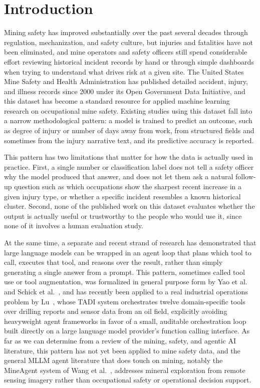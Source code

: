 \documentclass[11pt,a4paper]{article}
\begin{document}
\section{Introduction}

Mining safety has improved substantially over the past several decades
through regulation, mechanization, and safety culture, but injuries and
fatalities have not been eliminated, and mine operators and safety
officers still spend considerable effort reviewing historical incident
records by hand or through simple dashboards when trying to understand
what drives risk at a given site. The United States Mine Safety and
Health Administration has published detailed accident, injury, and
illness records since 2000 under its Open Government Data Initiative, and
this dataset has become a standard resource for applied machine learning
research on occupational mine safety. Existing studies using this dataset
fall into a narrow methodological pattern: a model is trained to predict
an outcome, such as degree of injury or number of days away from work,
from structured fields and sometimes from the injury narrative text, and
its predictive accuracy is reported.

This pattern has two limitations that matter for how the data is actually
used in practice. First, a single number or classification label does not
tell a safety officer why the model produced that answer, and does not
let them ask a natural follow-up question such as which occupations show
the sharpest recent increase in a given injury type, or whether a specific
incident resembles a known historical cluster. Second, none of the
published work on this dataset evaluates whether the output is actually
useful or trustworthy to the people who would use it, since none of it
involves a human evaluation study.

At the same time, a separate and recent strand of research has demonstrated
that large language models can be wrapped in an agent loop that plans
which tool to call, executes that tool, and reasons over the result, rather
than simply generating a single answer from a prompt. This pattern, sometimes
called tool use or tool augmentation, was formalized in general purpose form
by Yao et al.~\cite{Yao2023} and Schick et al.~\cite{Schick2023}, and has
recently been applied to a real industrial operations problem by Lu~\cite{Lu2026},
whose TADI system orchestrates twelve domain-specific tools over drilling
reports and sensor data from an oil field, explicitly avoiding heavyweight
agent frameworks in favor of a small, auditable orchestration loop built
directly on a large language model provider's function calling interface.
As far as we can determine from a review of the mining, safety, and agentic
AI literature, this pattern has not yet been applied to mine safety data,
and the general MLLM agent literature that does touch on mining, notably
the MineAgent system of Wang et al.~\cite{Wang2024}, addresses mineral
exploration from remote sensing imagery rather than occupational safety or
operational decision support.
\end{document}
